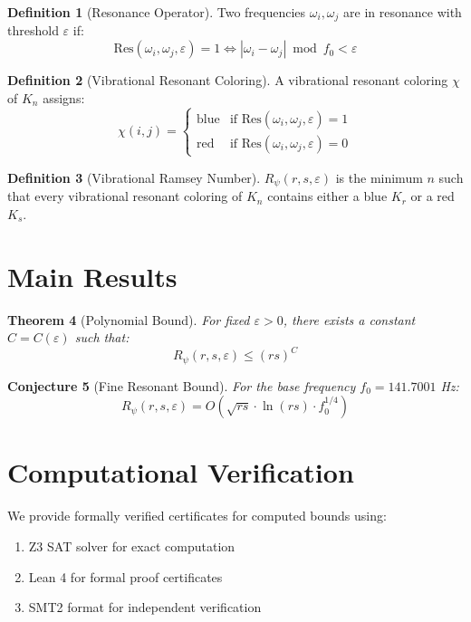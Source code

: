 \documentclass[11pt,a4paper]{article}
\theoremstyle{plain}
\newtheorem{theorem}{Theorem}
\newtheorem{conjecture}[theorem]{Conjecture}
\theoremstyle{definition}
\newtheorem{definition}[theorem]{Definition}
\theoremstyle{remark}
\begin{document}
\begin{definition}[Resonance Operator]
Two frequencies $\omega_i, \omega_j$ are in resonance with threshold $\varepsilon$ if:
\[
\text{Res}(\omega_i, \omega_j, \varepsilon) = 1 \iff |\omega_i - \omega_j| \bmod f_0 < \varepsilon
\]
\end{definition}

\begin{definition}[Vibrational Resonant Coloring]
A vibrational resonant coloring $\chi$ of $K_n$ assigns:
\[
\chi(i,j) = \begin{cases}
\text{blue} & \text{if } \text{Res}(\omega_i, \omega_j, \varepsilon) = 1 \\
\text{red} & \text{if } \text{Res}(\omega_i, \omega_j, \varepsilon) = 0
\end{cases}
\]
\end{definition}

\begin{definition}[Vibrational Ramsey Number]
$R_\psi(r,s,\varepsilon)$ is the minimum $n$ such that every vibrational resonant 
coloring of $K_n$ contains either a blue $K_r$ or a red $K_s$.
\end{definition}

\section{Main Results}

\begin{theorem}[Polynomial Bound]
\label{thm:polynomial}
For fixed $\varepsilon > 0$, there exists a constant $C = C(\varepsilon)$ such that:
\[
R_\psi(r,s,\varepsilon) \leq (rs)^C
\]
\end{theorem}

\begin{conjecture}[Fine Resonant Bound]
\label{conj:fine}
For the base frequency $f_0 = 141.7001$ Hz:
\[
R_\psi(r,s,\varepsilon) = O\left(\sqrt{rs} \cdot \ln(rs) \cdot f_0^{1/4}\right)
\]
\end{conjecture}

\section{Computational Verification}

We provide formally verified certificates for computed bounds using:
\begin{enumerate}
    \item Z3 SAT solver for exact computation
    \item Lean 4 for formal proof certificates
    \item SMT2 format for independent verification
\end{enumerate}
\end{document}
